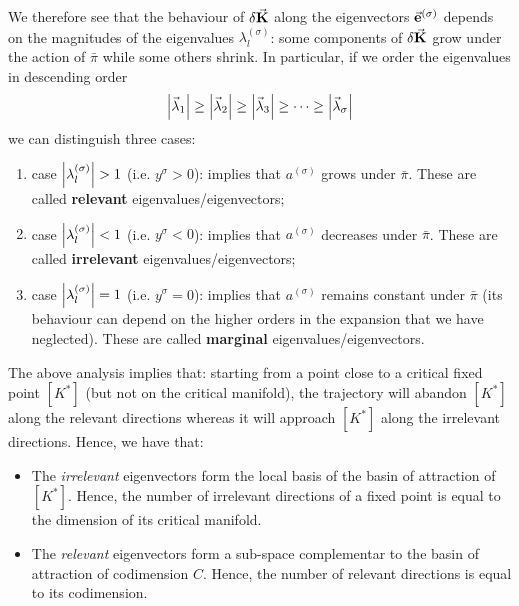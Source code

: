 \documentclass[../main/main.tex]{subfiles}
\begin{document}
We therefore see that the behaviour of \( \delta \va{K} \)  along the eigenvectors \( \va{e}^{(\sigma )} \)  depends on the magnitudes of the eigenvalues \( \lambda_l^{(\sigma )} \): some components of \( \delta \va{K} \) grow under the action of \( \bar{\pi }  \) while some others shrink. In particular, if we order the eigenvalues in descending order
\begin{equation*}
  \abs{\va{\lambda }_1} \ge \abs{\va{\lambda }_2} \ge \abs{\va{\lambda }_3} \ge \dots \ge \abs{\va{\lambda }_{\sigma}}
\end{equation*}
we can distinguish three cases:
\begin{enumerate}
\item case \( \abs{\lambda_l ^{(\sigma )}} > 1 \) (i.e. \( y^\sigma > 0\)): implies that \( a^{(\sigma )} \) grows under \( \bar{\pi }  \). These are called \textbf{relevant} eigenvalues/eigenvectors;

\item case \( \abs{\lambda_l ^{(\sigma )}} < 1 \) (i.e. \( y^\sigma < 0\)): implies that \( a^{(\sigma )} \) decreases under \( \bar{\pi }  \). These are called \textbf{irrelevant} eigenvalues/eigenvectors;

\item case \( \abs{\lambda_l ^{(\sigma )}} = 1 \) (i.e. \( y^\sigma =  0\)): implies that \( a^{(\sigma )} \) remains constant under \( \bar{\pi }  \) (its behaviour can depend on the higher orders in the expansion that we have neglected). These are called \textbf{marginal} eigenvalues/eigenvectors.
\end{enumerate}

The above analysis implies that: starting from a point close to a critical fixed point \( [K^*] \) (but not on the critical manifold), the trajectory will abandon \( [K^*] \) along the relevant directions whereas it will approach \( [K^*] \) along the irrelevant directions. Hence, we have that:
\begin{itemize}
\item The \emph{irrelevant} eigenvectors form the local basis of the basin of attraction of \( [K^*] \). Hence, the number of irrelevant directions of a fixed point is equal to the dimension of its critical manifold.
\item The \emph{relevant} eigenvectors form a sub-space complementar to the basin of attraction of codimension \( C \). Hence, the number of relevant directions is equal to its codimension.
\end{itemize}
\end{document}
